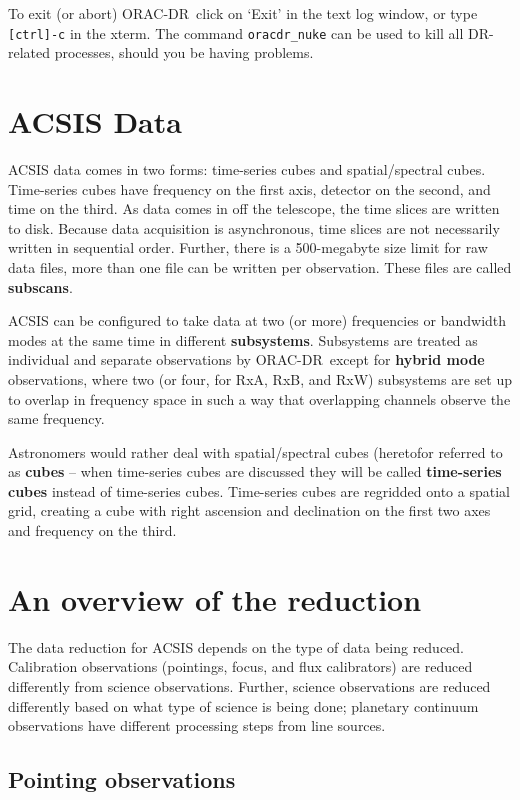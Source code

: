 \documentclass[twoside,11pt,nolof]{starlink}
\providecommand{\ORACDR}{{\footnotesize ORAC-DR}}
\begin{document}
To exit (or abort) \ORACDR\ click on `Exit' in the text log window, or
type \texttt{[ctrl]-c} in the xterm. The command \texttt{oracdr\_nuke} can
be used to kill all DR-related processes, should you be having
problems.

\section{ACSIS Data}

ACSIS data comes in two forms: time-series cubes and spatial/spectral
cubes. Time-series cubes have frequency on the first axis, detector on the
second, and time on the third. As data comes in off the telescope, the time
slices are written to disk. Because data acquisition is asynchronous, time
slices are not necessarily written in sequential order. Further, there is a
500-megabyte size limit for raw data files, more than one file can be written
per observation. These files are called \textbf{subscans}.

ACSIS can be configured to take data at two (or more) frequencies or bandwidth
modes at the same time in different \textbf{subsystems}. Subsystems are treated
as individual and separate observations by \ORACDR\, except for \textbf{hybrid
mode} observations, where two (or four, for RxA, RxB, and RxW) subsystems are
set up to overlap in frequency space in such a way that overlapping channels
observe the same frequency.

Astronomers would rather deal with spatial/spectral cubes (heretofor referred
to as \textbf{cubes} -- when time-series cubes are discussed they will be called
\textbf{time-series cubes} instead of time-series cubes. Time-series cubes are
regridded onto a spatial grid, creating a cube with right ascension and
declination on the first two axes and frequency on the third.

\section{An overview of the reduction}

The data reduction for ACSIS depends on the type of data being
reduced. Calibration observations (pointings, focus, and flux calibrators) are
reduced differently from science observations. Further, science observations
are reduced differently based on what type of science is being done; planetary
continuum observations have different processing steps from line sources.

\subsection{Pointing observations}
\end{document}
